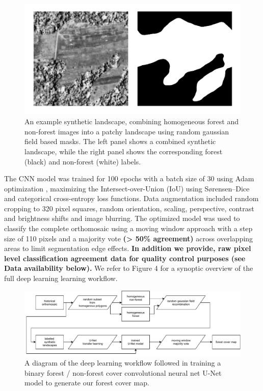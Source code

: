 \documentclass[remote sensing,article,submit,moreauthors,pdftex]{mdpi}
\begin{document}
\begin{figure}

{\centering \includegraphics[width=1\linewidth]{./figures/synthetic_landscape} 

}

\caption{An example synthetic landscape, combining homogeneous forest and non-forest images into a patchy landscape using random gaussian field based masks. The left panel shows a combined synthetic landscape, while the right panel shows the corresponding forest (black) and non-forest (white) labels.}\label{fig:unnamed-chunk-4}
\end{figure}

The CNN model was trained for 100 epochs with a batch size of 30 using
Adam optimization \citep{kingma2017}, maximizing the
Intersect-over-Union (IoU) using Sørensen--Dice and categorical
cross-entropy loss functions. Data augmentation included random cropping
to 320 pixel squares, random orientation, scaling, perspective, contrast
and brightness shifts and image blurring. The optimized model was used
to classify the complete orthomosaic using a moving window approach with
a step size of 110 pixels and a majority vote \textbf{(\textgreater{}
50\% agreement)} across overlapping areas to limit segmentation edge
effects. \textbf{In addition we provide, raw pixel level classification
agreement data for quality control purposes (see Data availability
below).} We refer to Figure 4 for a synoptic overview of the full deep
learning learning workflow.

\begin{figure}

{\centering \includegraphics[width=1\linewidth]{./figures/cnn_diagram} 

}

\caption{A diagram of the deep learning workflow followed in training a binary forest / non-forest cover convolutional neural net U-Net model to generate our forest cover map.}\label{fig:unnamed-chunk-5}
\end{figure}
\end{document}
